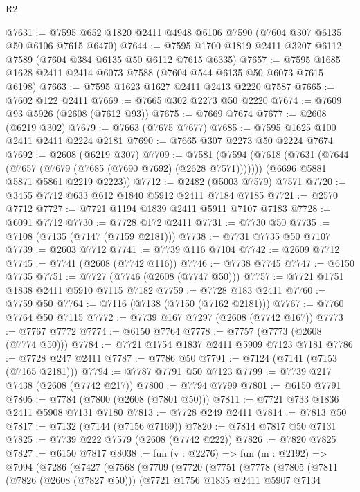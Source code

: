 \begin{lexlean}{R2}
\begin{coremodule}
@7631 := @7595 @652 @1820 @2411 @4948 @6106 @7590 (@7604 @307 @6135 @50 @6106 @7615 @6470)
@7644 := @7595 @1700 @1819 @2411 @3207 @6112 @7589 (@7604 @384 @6135 @50 @6112 @7615 @6335)
@7657 := @7595 @1685 @1628 @2411 @2414 @6073 @7588 (@7604 @544 @6135 @50 @6073 @7615 @6198)
@7663 := @7595 @1623 @1627 @2411 @2413 @2220 @7587
@7665 := @7602 @122 @2411
@7669 := @7665 @302 @2273 @50 @2220
@7674 := @7609 @93 @5926 (@2608 (@7612 @93))
@7675 := @7669 @7674
@7677 := @2608 (@6219 @302)
@7679 := @7663 (@7675 @7677)
@7685 := @7595 @1625 @100 @2411 @2411 @2224 @2181
@7690 := @7665 @307 @2273 @50 @2224 @7674
@7692 := @2608 (@6219 @307)
@7709 := @7581
    (@7594
      (@7618 (@7631 (@7644 (@7657 (@7679 (@7685 (@7690 @7692) (@2628 @7571)))))))
      (@6696 @5881 @5871 @5861 @2219 @2223))
@7712 := @2482 (@5003 @7579) @7571
@7720 := @3455 @7712 @633 @612 @1840 @5912 @2411 @7184 @7185
@7721 := @2570 @7712
@7727 := @7721 @1194 @1839 @2411 @5911 @7107 @7183
@7728 := @6091 @7712
@7730 := @7728 @172 @2411
@7731 := @7730 @50
@7735 := @7108 (@7135 (@7147 (@7159 @2181)))
@7738 := @7731 @7735 @50 @7107
@7739 := @2603 @7712
@7741 := @7739 @116 @7104
@7742 := @2609 @7712
@7745 := @7741 (@2608 (@7742 @116))
@7746 := @7738 @7745
@7747 := @6150 @7735
@7751 := @7727 (@7746 (@2608 (@7747 @50)))
@7757 := @7721 @1751 @1838 @2411 @5910 @7115 @7182
@7759 := @7728 @183 @2411
@7760 := @7759 @50
@7764 := @7116 (@7138 (@7150 (@7162 @2181)))
@7767 := @7760 @7764 @50 @7115
@7772 := @7739 @167 @7297 (@2608 (@7742 @167))
@7773 := @7767 @7772
@7774 := @6150 @7764
@7778 := @7757 (@7773 (@2608 (@7774 @50)))
@7784 := @7721 @1754 @1837 @2411 @5909 @7123 @7181
@7786 := @7728 @247 @2411
@7787 := @7786 @50
@7791 := @7124 (@7141 (@7153 (@7165 @2181)))
@7794 := @7787 @7791 @50 @7123
@7799 := @7739 @217 @7438 (@2608 (@7742 @217))
@7800 := @7794 @7799
@7801 := @6150 @7791
@7805 := @7784 (@7800 (@2608 (@7801 @50)))
@7811 := @7721 @733 @1836 @2411 @5908 @7131 @7180
@7813 := @7728 @249 @2411
@7814 := @7813 @50
@7817 := @7132 (@7144 (@7156 @7169))
@7820 := @7814 @7817 @50 @7131
@7825 := @7739 @222 @7579 (@2608 (@7742 @222))
@7826 := @7820 @7825
@7827 := @6150 @7817
@8038 := fun (v : @2276) =>
  fun (m : @2192) =>
  @7094
    (@7286
      (@7427
        (@7568
          (@7709
            (@7720
              (@7751
                (@7778
                  (@7805
                    (@7811
                      (@7826 (@2608 (@7827 @50)))
                      (@7721
                        @1756
                        @1835
                        @2411
                        @5907
                        @7134

\end{coremodule}
\end{lexlean}
